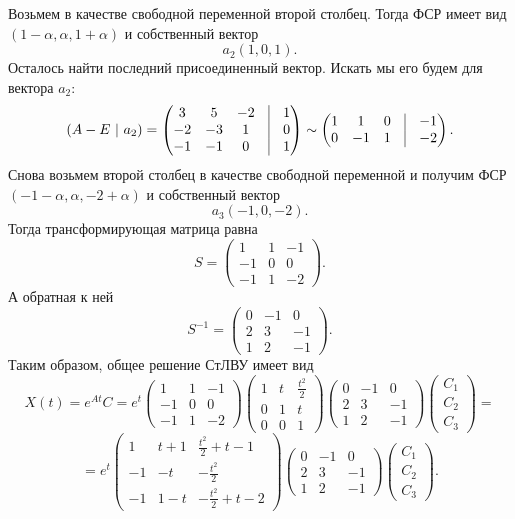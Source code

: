 \documentclass[a4paper, 12pt]{article}
\begin{document}
Возьмем в качестве свободной переменной второй столбец. Тогда ФСР имеет вид $(1 - \alpha, \alpha, 1 + \alpha)$ и собственный вектор $$a_2(1,0,1).$$
Осталось найти последний присоединенный вектор. Искать мы его будем для вектора $a_2$:
$$(A-E\ |\ a_2) = \begin{pmatrix}
	3 & 5 & -2 & \vline & 1\\
	-2 & -3 & 1 & \vline & 0\\
	-1 & -1 & 0 & \vline & 1
\end{pmatrix}\sim\begin{pmatrix}
1 & 1 & 0 & \vline & -1\\
0 & -1 & 1 & \vline & -2\\
\end{pmatrix}.$$
Снова возьмем второй столбец в качестве свободной переменной и получим ФСР $(-1-\alpha, \alpha, -2 + \alpha)$ и собственный вектор 
$$a_3(-1, 0, -2).$$
Тогда трансформирующая матрица равна
$$S =\begin{pmatrix}
	1 & 1 & -1\\
	-1 & 0 & 0\\
	-1 & 1 & -2
\end{pmatrix}.$$
А обратная к ней 
$$S^{-1} = \begin{pmatrix}
	0 & -1 & 0\\
	2 & 3 & -1\\
	1 & 2 & -1
\end{pmatrix}.$$
Таким образом, общее решение СтЛВУ имеет вид $$X(t) = e^{At}C = e^t\begin{pmatrix}
	1 & 1 & -1\\
	-1 & 0 & 0\\
	-1 & 1 & -2
\end{pmatrix}\begin{pmatrix}
1 & t & \frac{t^2}{2}\\
0 & 1 & t\\
0 & 0 & 1
\end{pmatrix}\begin{pmatrix}
0 & -1 & 0\\
2 & 3 & -1\\
1 & 2 & -1
\end{pmatrix}\begin{pmatrix}
C_1\\C_2\\C_3
\end{pmatrix}=$$ $$=e^t\begin{pmatrix}
1 & t+1 & \frac{t^2}{2} + t - 1\\
-1 & -t & -\frac{t^2}{2}\\
-1 & 1-t & -\frac{t^2}{2} + t - 2
\end{pmatrix}\begin{pmatrix}
0 & -1 & 0\\
2 & 3 & -1\\
1 & 2 & -1
\end{pmatrix}\begin{pmatrix}
C_1\\C_2\\C_3
\end{pmatrix}.$$
\end{document}
